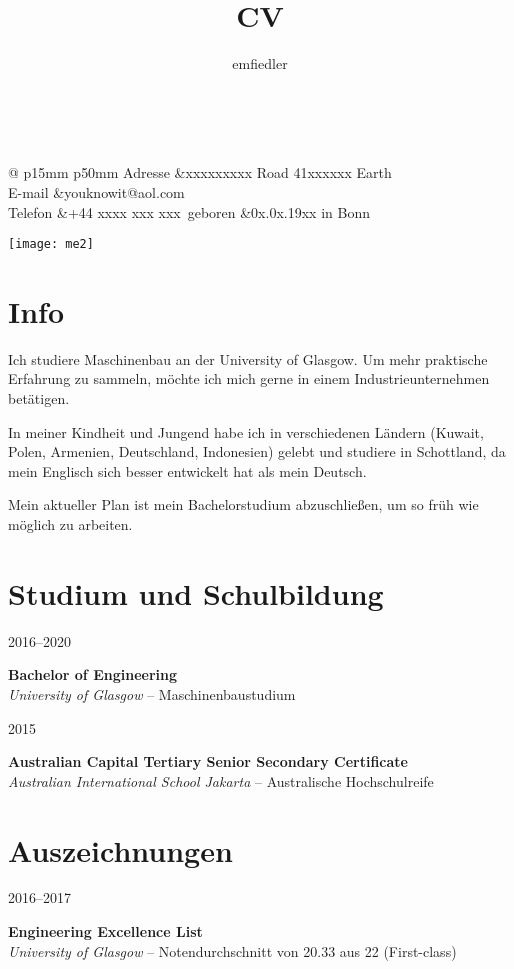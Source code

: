 \documentclass[a4paper]{article}
\title{CV}
\author{emfiedler}
\makeatletter
\renewcommand{\maketitle}{
\begin{flushleft}
{\Huge
\theauthor} \\
\vspace{3mm}
\hspace{3mm} 
\begingroup
\renewcommand{\arraystretch}{1.2}
\begin{tabular}{@{} p{15mm} p{50mm}}
	Adresse	&xxxxxxxxx Road 41\newline xxxxxx Earth\\
	E-mail 	&youknowit@aol.com\\
	Telefon	&+44 xxxx xxx xxx\
	geboren	&0x.0x.19xx in Bonn
\end{tabular}
\endgroup

\end{flushleft}
}
\newcommand{\entry}[4]{

	\begin{minipage}[t]{.20\textwidth}
		\hfill \textsc{#1}

	\end{minipage}
	\hfill\vline\hfill
	\begin{minipage}[t]{.75\textwidth}
		\textbf{#2} \\ 
		\textit{#3}    
		#4

	\end{minipage} 
	\vspace{.25cm}

}
\makeatother
\begin{document}

\begin{minipage}{0.73\textwidth}
\maketitle
\end{minipage}
\begin{minipage}{0.25\textwidth}
	\hspace{2mm} 
	\vspace{-2mm} 
	\texttt{[image: me2]}
\end{minipage}

\section{Info}
Ich studiere Maschinenbau an der University of Glasgow. Um mehr praktische Erfahrung zu sammeln, m{\"o}chte ich mich gerne in einem Industrieunternehmen bet{\"a}tigen.

\vspace{.25cm}

In meiner Kindheit und Jungend habe ich in verschiedenen L{\"a}ndern (Kuwait, Polen, Armenien, Deutschland, Indonesien) gelebt und studiere in Schottland, da mein Englisch sich besser entwickelt hat als mein Deutsch.

\vspace{.25cm}

Mein aktueller Plan ist mein Bachelorstudium abzuschlie{\ss}en, um so fr{\"u}h wie m{\"o}glich zu arbeiten.


\section{Studium und Schulbildung}

\entry{2016--2020}{Bachelor of Engineering}{University of Glasgow}{-- Maschinenbaustudium}

\entry{2015}{Australian Capital Tertiary Senior Secondary Certificate}{Australian International School Jakarta}{-- Australische Hochschulreife}


\section{Auszeichnungen}

\entry{2016--2017}{Engineering Excellence List}{University of Glasgow}{-- Notendurchschnitt von 20.33 aus 22 (First-class)}
\end{document}
